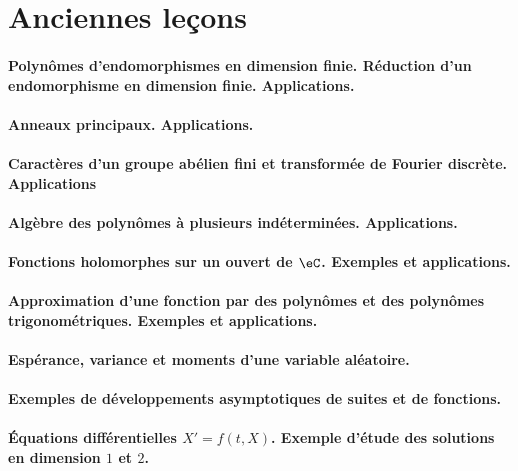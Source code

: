 \section{Anciennes leçons}

\paragraph{Polynômes d'endomorphismes en dimension finie. Réduction d'un endomorphisme en dimension finie. Applications.}
\paragraph{Anneaux principaux. Applications.}
\paragraph{Caractères d'un groupe abélien fini et transformée de Fourier discrète. Applications}
\paragraph{Algèbre des polynômes à plusieurs indéterminées. Applications.}
\paragraph{Fonctions holomorphes sur un ouvert de $\eC$. Exemples et applications.}
\paragraph{Approximation d'une fonction par des polynômes et des polynômes trigonométriques. Exemples et applications.}
\paragraph{Espérance, variance et moments d'une variable aléatoire.}
\paragraph{Exemples de développements asymptotiques de suites et de fonctions.}
\paragraph{Équations différentielles \( X'=f(t,X)\). Exemple d'étude des solutions en dimension \( 1\) et \( 2\).}
